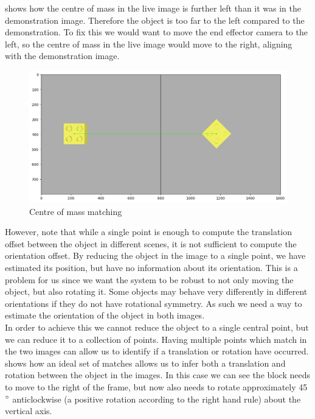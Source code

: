  shows how the centre of mass in the live image is further left than it was in the demonstration image. Therefore the object is too far to the left compared to the demonstration. To fix this we would want to move the end effector camera to the left, so the centre of mass in the live image would move to the right, aligning with the demonstration image.

\begin{figure}[h]
    \centering
    \includegraphics[width=\textwidth]{figures/ideal_centre-of-mass.png}
    \caption{Centre of mass matching}
    \label{fig:centre-of-mass}
\end{figure}

However, note that while a single point is enough to compute the translation offset between the object in different scenes, it is not sufficient to compute the orientation offset. By reducing the object in the image to a single point, we have estimated its position, but have no information about its orientation. This is a problem for us since we want the system to be robust to not only moving the object, but also rotating it. Some objects may behave very differently in different orientations if they do not have rotational symmetry. As such we need a way to estimate the orientation of the object in both images.\\

In order to achieve this we cannot reduce the object to a single central point, but we can reduce it to a collection of points. Having multiple points which match in the two images can allow us to identify if a translation or rotation have occurred.  shows how an ideal set of matches allows us to infer both a translation and rotation between the object in the images. In this case we can see the block needs to move to the right of the frame, but now also needs to rotate approximately 45$\operatorname{^{\circ}}$ anticlockwise (a positive rotation according to the right hand rule) about the vertical axis.

